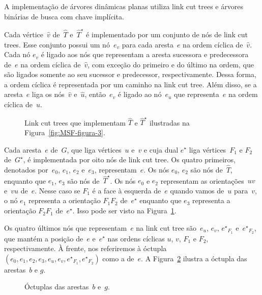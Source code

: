 A implementação de árvores dinâmicas planas utiliza link cut trees e árvores binárias de busca com chave implícita.

Cada vértice~$\hat v$ de~$\hat T$ e~$\hat T^\star$ é implementado por um conjunto de nós de link cut trees.
Esse conjunto possui um nó~$e_v$ para cada aresta~$e$ na ordem cíclica de~$\hat v$.
Cada nó $e_v$ é ligado aos nós que representam a aresta sucessora e predecessora de~$e$ na ordem cíclica de~$\hat v$,
com exceção do primeiro e do último na ordem, que são ligados somente ao seu sucessor e predecessor, respectivamente.
Dessa forma, a ordem cíclica é representada por um caminho na link cut tree.
Além disso, se a aresta~$e$ liga os nós~$\hat v$ e~$\hat u$, então~$e_v$ é ligado ao nó~$e_u$ que representa~$e$ na ordem cíclica de~$\hat u$.

\begin{figure}[htb]
\scalebox{1.3}{
\centering

}
\caption{Link cut trees que implementam $\hat T$ e $\hat T^\star$ ilustradas na Figura~\ref{fig:MSF-figura-3}.}
\label{fig:MSF-figura-4}
\end{figure}

Cada aresta~$e$ de~$G$, que liga vértices~$u$ e~$v$ e cuja dual $e^\star$ liga vértices~$F_1$ e $F_2$ de~$G^\star$, é implementada por oito nós de link cut tree.
Os quatro primeiros, denotados por~$e_0$, $e_1$, $e_2$ e~$e_3$, representam~$e$.
Os nós $e_0$, $e_2$ são nós de~$\hat T$, enquanto que $e_1$, $e_3$ são nós de~$\hat T^\star$.
Os nós $e_0$ e $e_2$ representam as orientações~$uv$ e~$vu$ de~$e$.
Nesse caso se $F_1$ é a face à esquerda de~$e$ quando vamos de~$u$ para~$v$, o nó $e_1$ representa a orientação $F_1F_2$ de~$e^\star$ enquanto que $e_3$ representa a orientação $F_2F_1$ de~$e^\star$.
Isso pode ser visto na Figura~\ref{fig:MSF-figura-4}.

Os quatro últimos nós que representam~$e$ na link cut tree são~$e_u$, $e_v$, ${e^\star}_{F_1}$ e~${e^\star}_{F_2}$, que mantém a posição de~$e$ e~$e^\star$ nas ordens cíclicas $u$, $v$, $F_1$ e $F_2$, respectivamente.
À frente, nos referiremos à óctupla $( e_0, e_1, e_2, e_3, e_u, e_v, {e^\star}_{F_1}, {e^\star}_{F_2})$ como a  de~$e$.
A Figura~\ref{fig:MSF-octo} ilustra a óctupla das arestas~$b$ e $g$.


\begin{figure}[htb]
\centering

\caption{Óctuplas das arestas~$b$ e~$g$.}
\label{fig:MSF-octo}
\end{figure}

